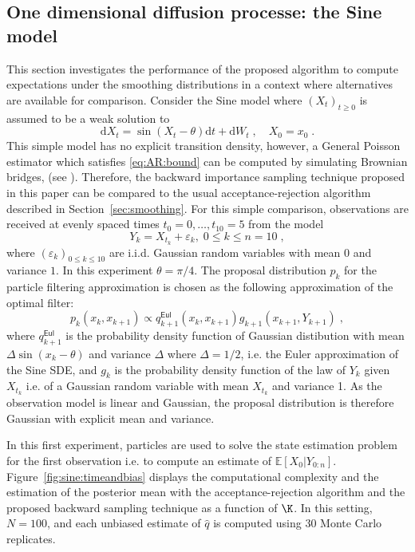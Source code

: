 \documentclass{article}
\def\pE{\mathbb{E}}
\newcommand{\rmd}{\ensuremath{\mathrm{d}}}
\newcommand{\eqsp}{\;}
\begin{document}
\subsection{One dimensional diffusion processe: the Sine model}
\label{sec:simu:SINE}
This section investigates the performance of the proposed algorithm to compute  expectations under the smoothing distributions in a context where  alternatives are available for comparison. Consider the Sine model where $(X_t)_{t\geqslant 0}$ is assumed to be a weak solution to
$$
\rmd X_t = \sin(X_t-\theta)\rmd t + \rmd W_t\eqsp,\quad X_0 = x_0\eqsp.
$$
This simple model has no explicit transition density, however, a General Poisson estimator which satisfies \eqref{eq:AR:bound} can be computed by simulating Brownian bridges, (see \cite{beskos2006exact}). 
Therefore, the backward importance sampling technique proposed in this paper can be compared to the usual acceptance-rejection algorithm described in Section~\ref{sec:smoothing}. 
For this simple comparison, observations are received at evenly spaced times $t_0=0,\ldots, t_{10} = 5$ from the model
\begin{equation}
\label{eq:obs:model:SINE}
Y_k=X_{t_k}+\varepsilon_k,\eqsp 0\leqslant k \leqslant n = 10\eqsp,
\end{equation}
where $(\varepsilon_k)_{0 \leqslant k\leqslant 10}$ are i.i.d. Gaussian random variables with mean $0$ and variance $1$. In this experiment $\theta = \pi/4$. 
The proposal distribution $p_k$ for the particle filtering approximation is chosen as the following approximation of the optimal filter:
\begin{equation}
\label{eq:optimal:filter}
p_{k}(x_{k},x_{k+1})\!\propto\! q^{\mathsf{Eul}}_{k+1}(x_{k},x_{k+1})g_{k+1}(x_{k+1},Y_{k+1})\eqsp,
\end{equation}
where $q^{\mathsf{Eul}}_{k+1}$ is the probability density function of Gaussian distibution with mean $\Delta \sin(x_k-\theta)$ and variance $\Delta$ where $\Delta = 1/2$, i.e. the Euler approximation of the Sine SDE, and $g_k$ is the probability density function of the law of $Y_k$ given $X_{t_k}$ i.e. of a Gaussian random variable with mean $X_{t_k}$ and variance 1. 
As the observation model is linear and Gaussian, the proposal distribution is therefore Gaussian with explicit mean and variance. 

In this first experiment, particles are used to solve the state estimation problem for the first observation i.e. to compute an estimate of $ \pE[ X_{0} | Y_{0:n}]$.
Figure~\ref{fig:sine:timeandbias} displays the computational complexity and the estimation of the posterior mean with the acceptance-rejection algorithm and the proposed backward sampling technique as a function of $\K$. 
In this setting, $N=100$, and each unbiased estimate of $\hat{q}$ is computed using 30 Monte Carlo replicates.
\end{document}
